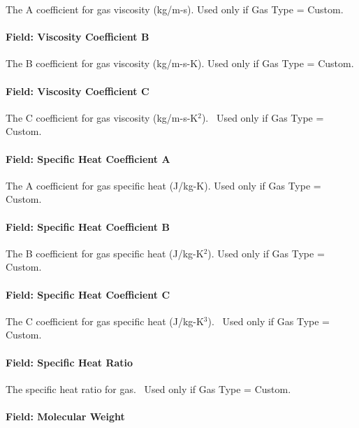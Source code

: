 The A coefficient for gas viscosity (kg/m-s). Used only if Gas Type = Custom.

\paragraph{Field: Viscosity Coefficient B}\label{field-viscosity-coefficient-b}

The B coefficient for gas viscosity (kg/m-s-K). Used only if Gas Type = Custom.

\paragraph{Field: Viscosity Coefficient C}\label{field-viscosity-coefficient-c}

The C coefficient for gas viscosity (kg/m-s-K\(^{2}\)).~ Used only if Gas Type = Custom.

\paragraph{Field: Specific Heat Coefficient A}\label{field-specific-heat-coefficient-a}

The A coefficient for gas specific heat (J/kg-K). Used only if Gas Type = Custom.

\paragraph{Field: Specific Heat Coefficient B}\label{field-specific-heat-coefficient-b}

The B coefficient for gas specific heat (J/kg-K\(^{2}\)). Used only if Gas Type = Custom.

\paragraph{Field: Specific Heat Coefficient C}\label{field-specific-heat-coefficient-c}

The C coefficient for gas specific heat (J/kg-K\(^{3}\)).~ Used only if Gas Type = Custom.

\paragraph{Field: Specific Heat Ratio}\label{field-specific-heat-ratio}

The specific heat ratio for gas.~ Used only if Gas Type = Custom.

\paragraph{Field: Molecular Weight}\label{field-molecular-weight}

